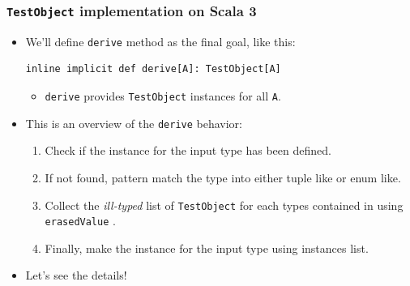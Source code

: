 \begin{frame}[fragile]
  \frametitle{\lstinline|TestObject| implementation on Scala 3}

  \begin{itemize}
    \item<+-> We'll define \lstinline|derive| method as the final goal, like this:
\begin{lstlisting}[style=scala]
inline implicit def derive[A]: TestObject[A]
\end{lstlisting}   
    \begin{itemize}
      \item \lstinline|derive| provides \lstinline|TestObject| instances for all \lstinline|A|.
    \end{itemize}

    \item<+-> This is an overview of the \lstinline|derive| behavior:
    \begin{enumerate}
      \item Check if the instance for the input type has been defined.
      \item If not found, pattern match the type into either tuple like or enum like. \label{enum:tuple_or_enum}
      \item Collect the \emph{ill-typed} list of \lstinline|TestObject| for each types contained in 
      using \lstinline|erasedValue| \label{enum:instances_list}.
      \item Finally, make the instance for the input type using  instances list.
    \end{enumerate}

    \item<+-> Let's see the details!
  \end{itemize}

\end{frame}

